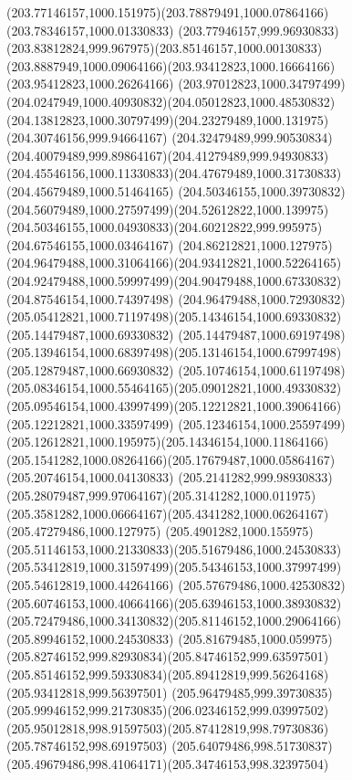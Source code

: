 {{  \curveto(203.77146157,1000.151975)(203.78879491,1000.07864166)(203.78346157,1000.01330833)
  \curveto(203.77946157,999.96930833)(203.83812824,999.967975)(203.85146157,1000.00130833)
  \curveto(203.8887949,1000.09064166)(203.93412823,1000.16664166)(203.95412823,1000.26264166)
  \curveto(203.97012823,1000.34797499)(204.0247949,1000.40930832)(204.05012823,1000.48530832)
  \curveto(204.13812823,1000.30797499)(204.23279489,1000.131975)(204.30746156,999.94664167)
  \curveto(204.32479489,999.90530834)(204.40079489,999.89864167)(204.41279489,999.94930833)
  \curveto(204.45546156,1000.11330833)(204.47679489,1000.31730833)(204.45679489,1000.51464165)
  \curveto(204.50346155,1000.39730832)(204.56079489,1000.27597499)(204.52612822,1000.139975)
  \curveto(204.50346155,1000.04930833)(204.60212822,999.995975)(204.67546155,1000.03464167)
  \curveto(204.86212821,1000.127975)(204.96479488,1000.31064166)(204.93412821,1000.52264165)
  \curveto(204.92479488,1000.59997499)(204.90479488,1000.67330832)(204.87546154,1000.74397498)
  \curveto(204.96479488,1000.72930832)(205.05412821,1000.71197498)(205.14346154,1000.69330832)
  \lineto(205.14479487,1000.69330832)
  \lineto(205.14479487,1000.69197498)
  \curveto(205.13946154,1000.68397498)(205.13146154,1000.67997498)(205.12879487,1000.66930832)
  \curveto(205.10746154,1000.61197498)(205.08346154,1000.55464165)(205.09012821,1000.49330832)
  \curveto(205.09546154,1000.43997499)(205.12212821,1000.39064166)(205.12212821,1000.33597499)
  \curveto(205.12346154,1000.25597499)(205.12612821,1000.195975)(205.14346154,1000.11864166)
  \curveto(205.1541282,1000.08264166)(205.17679487,1000.05864167)(205.20746154,1000.04130833)
  \curveto(205.2141282,999.98930833)(205.28079487,999.97064167)(205.3141282,1000.011975)
  \curveto(205.3581282,1000.06664167)(205.4341282,1000.06264167)(205.47279486,1000.127975)
  \curveto(205.4901282,1000.155975)(205.51146153,1000.21330833)(205.51679486,1000.24530833)
  \curveto(205.53412819,1000.31597499)(205.54346153,1000.37997499)(205.54612819,1000.44264166)
  \curveto(205.57679486,1000.42530832)(205.60746153,1000.40664166)(205.63946153,1000.38930832)
  \curveto(205.72479486,1000.34130832)(205.81146152,1000.29064166)(205.89946152,1000.24530833)
  \curveto(205.81679485,1000.059975)(205.82746152,999.82930834)(205.84746152,999.63597501)
  \curveto(205.85146152,999.59330834)(205.89412819,999.56264168)(205.93412818,999.56397501)
  \curveto(205.96479485,999.39730835)(205.99946152,999.21730835)(206.02346152,999.03997502)
  \curveto(205.95012818,998.91597503)(205.87412819,998.79730836)(205.78746152,998.69197503)
  \curveto(205.64079486,998.51730837)(205.49679486,998.41064171)(205.34746153,998.32397504)
}}
